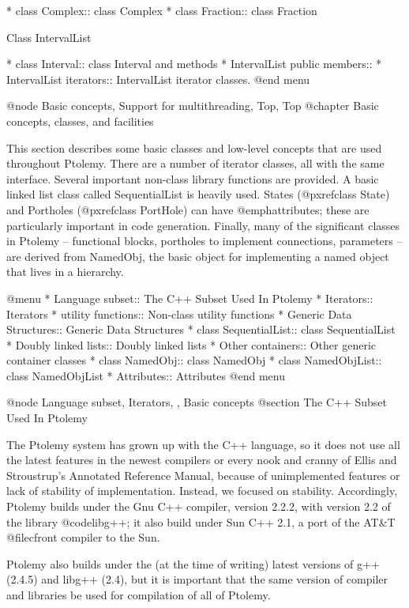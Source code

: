 * class Complex::   class Complex
* class Fraction::  class Fraction

Class IntervalList

* class Interval::  class Interval and methods
* IntervalList public members::  
* IntervalList iterators::  IntervalList iterator classes.
@end menu

@node Basic concepts, Support for multithreading, Top, Top
@chapter Basic concepts, classes, and facilities

This section describes some basic classes and low-level concepts that
are used throughout Ptolemy.  There are a number of iterator classes,
all with the same interface.  Several important non-class library
functions are provided.  A basic linked list class called
SequentialList is heavily used.  States (@pxref{class State})
and Portholes (@pxref{class PortHole}) can have
@emph{attributes}; these are particularly important in code generation.
Finally, many of the significant classes in Ptolemy -- functional
blocks, portholes to implement connections, parameters -- are derived
from NamedObj, the basic object for implementing a named object that
lives in a hierarchy.

@menu
* Language subset::  The C++ Subset Used In Ptolemy
* Iterators::       Iterators
* utility functions::  Non-class utility functions
* Generic Data Structures::  Generic Data Structures
* class SequentialList::  class SequentialList
* Doubly linked lists::  Doubly linked lists
* Other containers::  Other generic container classes
* class NamedObj::  class NamedObj
* class NamedObjList::  class NamedObjList
* Attributes::      Attributes
@end menu

@node Language subset, Iterators,  , Basic concepts
@section The C++ Subset Used In Ptolemy

The Ptolemy system has grown up with the C++ language, so it does not
use all the latest features in the newest compilers or every nook and
cranny of Ellis and Stroustrup's Annotated Reference Manual, because
of unimplemented features or lack of stability of implementation.
Instead, we focused on stability.  Accordingly, Ptolemy builds under
the Gnu C++ compiler, version 2.2.2, with version 2.2 of the library
@code{libg++}; it also build under Sun C++ 2.1, a port of the AT&T
@file{cfront} compiler to the Sun.

Ptolemy also builds under the (at the time of writing) latest versions
of g++ (2.4.5) and libg++ (2.4), but it is important that the same
version of compiler and libraries be used for compilation of all of
Ptolemy.

